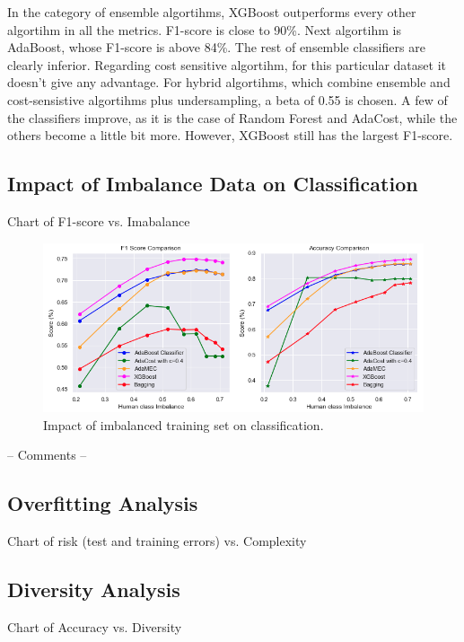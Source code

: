 \documentclass[conference]{IEEEtran}
\begin{document}
In the category of ensemble algortihms, XGBoost outperforms every other algortihm in all the metrics. F1-score is close to 90\%. Next algortihm is AdaBoost, whose F1-score is above 84\%. The rest of ensemble classifiers are clearly inferior. Regarding cost sensitive algortihm, for this particular dataset it doesn't give any advantage. For hybrid algortihms, which combine ensemble and cost-sensistive algortihms plus undersampling, a beta of 0.55 is chosen. A few of the classifiers improve, as it is the case of Random Forest and AdaCost, while the others become a little bit more. However, XGBoost still has the largest F1-score. 

\subsection{Impact of Imbalance Data on Classification}

Chart of F1-score vs. Imabalance

\begin{figure}[htbp]
\centerline{\includegraphics[scale=0.35]{pictures/Imbalance_Comparison1.png}}
\caption{Impact of imbalanced training set on classification.}
\label{ImbalanceComparison}
\end{figure}

-- Comments --

\subsection{Overfitting Analysis}

Chart of risk (test and training errors) vs. Complexity

\subsection{Diversity Analysis}

Chart of Accuracy vs. Diversity
\end{document}
